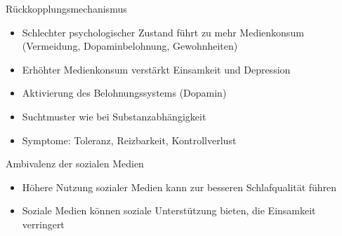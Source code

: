 \begin{frame}{Rückkopplungsmechanismus~\cite{de_social_nodate}}
    \begin{itemize}
        \item Schlechter psychologischer Zustand führt zu mehr Medienkonsum (Vermeidung, Dopaminbelohnung, Gewohnheiten)
        \item Erhöhter Medienkonsum verstärkt Einsamkeit und Depression
        \item Aktivierung des Belohnungssystems (Dopamin)
        \item Suchtmuster wie bei Substanzabhängigkeit
        \item Symptome: Toleranz, Reizbarkeit, Kontrollverlust
    \end{itemize}
\end{frame}
\begin{frame}{Ambivalenz der sozialen Medien~\cite{santini_social_2024}}
    \begin{itemize}
        \item Höhere Nutzung sozialer Medien kann zur besseren Schlafqualität führen
        \item Soziale Medien können soziale Unterstützung bieten, die Einsamkeit verringert
    \end{itemize}
\end{frame}

